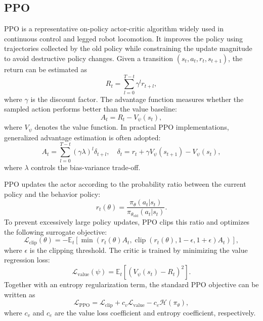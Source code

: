 \documentclass[conference]{IEEEtran}
\begin{document}
\subsection{PPO}
\label{subsec:ppo_background}

PPO is a representative on-policy actor-critic algorithm widely used in continuous control and legged robot locomotion. It improves the policy using trajectories collected by the old policy while constraining the update magnitude to avoid destructive policy changes. Given a transition $(s_t,a_t,r_t,s_{t+1})$, the return can be estimated as
\begin{equation}
\label{eq:return_def}
    R_t=\sum_{l=0}^{T-t}\gamma^l r_{t+l},
\end{equation}
where $\gamma$ is the discount factor. The advantage function measures whether the sampled action performs better than the value baseline:
\begin{equation}
\label{eq:advantage_def}
    A_t=R_t-V_{\psi}(s_t),
\end{equation}
where $V_{\psi}$ denotes the value function. In practical PPO implementations, generalized advantage estimation is often adopted:
\begin{equation}
\label{eq:gae_def}
    A_t=\sum_{l=0}^{T-t}(\gamma\lambda)^l \delta_{t+l},
    \quad
    \delta_t=r_t+\gamma V_{\psi}(s_{t+1})-V_{\psi}(s_t),
\end{equation}
where $\lambda$ controls the bias-variance trade-off.

PPO updates the actor according to the probability ratio between the current policy and the behavior policy:
\begin{equation}
\label{eq:ppo_ratio_intro}
    r_t(\theta)=
    \frac{\pi_{\theta}(a_t|s_t)}
    {\pi_{\theta_{\mathrm{old}}}(a_t|s_t)}.
\end{equation}
To prevent excessively large policy updates, PPO clips this ratio and optimizes the following surrogate objective:
\begin{equation}
\label{eq:ppo_clip_intro}
    \mathcal{L}_{\mathrm{clip}}(\theta)
    =
    -\mathbb{E}_{t}
    \left[
    \min
    \left(
    r_t(\theta)A_t,
    \operatorname{clip}(r_t(\theta),1-\epsilon,1+\epsilon)A_t
    \right)
    \right],
\end{equation}
where $\epsilon$ is the clipping threshold. The critic is trained by minimizing the value regression loss:
\begin{equation}
\label{eq:value_loss_intro}
    \mathcal{L}_{\mathrm{value}}(\psi)
    =
    \mathbb{E}_{t}
    \left[
    \left(
    V_{\psi}(s_t)-R_t
    \right)^2
    \right].
\end{equation}
Together with an entropy regularization term, the standard PPO objective can be written as
\begin{equation}
\label{eq:ppo_total_intro}
    \mathcal{L}_{\mathrm{PPO}}
    =
    \mathcal{L}_{\mathrm{clip}}
    +
    c_v\mathcal{L}_{\mathrm{value}}
    -
    c_e\mathcal{H}(\pi_{\theta}),
\end{equation}
where $c_v$ and $c_e$ are the value loss coefficient and entropy coefficient, respectively.
\end{document}
